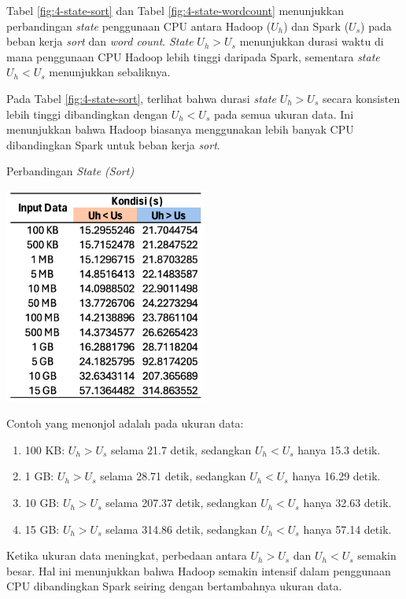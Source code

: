 Tabel \ref{fig:4-state-sort} dan Tabel \ref{fig:4-state-wordcount} menunjukkan perbandingan \textit{state} penggunaan CPU antara Hadoop ($U_h$) dan Spark ($U_s$) pada beban kerja \textit{sort} dan \textit{word count}. \textit{State} $U_h > U_s$ menunjukkan durasi waktu di mana penggunaan CPU Hadoop lebih tinggi daripada Spark, sementara \textit{state} $U_h < U_s$ menunjukkan sebaliknya.

Pada Tabel \ref{fig:4-state-sort}, terlihat bahwa durasi \textit{state} $U_h > U_s$ secara konsisten lebih tinggi dibandingkan dengan $U_h < U_s$ pada semua ukuran data. Ini menunjukkan bahwa Hadoop biasanya menggunakan lebih banyak CPU dibandingkan Spark untuk beban kerja \textit{sort}.

\begin{table}[h]
  \centering
  \caption{Perbandingan \textit{State (Sort)}}
  \includegraphics[width=0.5\textwidth]{figures/ch04/4-kondisi-sort}
  \label{fig:4-state-sort}
\end{table}

Contoh yang menonjol adalah pada ukuran data:
\begin{enumerate}
	\item 100 KB: $U_h > U_s$ selama 21.7 detik, sedangkan $U_h < U_s$ hanya 15.3 detik.
	\item 1 GB: $U_h > U_s$ selama 28.71 detik, sedangkan $U_h < U_s$ hanya 16.29 detik.
	\item 10 GB: $U_h > U_s$ selama 207.37 detik, sedangkan $U_h < U_s$ hanya 32.63 detik.
	\item 15 GB: $U_h > U_s$ selama 314.86 detik, sedangkan $U_h < U_s$ hanya 57.14 detik.
\end{enumerate}

Ketika ukuran data meningkat, perbedaan antara $U_h > U_s$ dan $U_h < U_s$ semakin besar. Hal ini menunjukkan bahwa Hadoop semakin intensif dalam penggunaan CPU dibandingkan Spark seiring dengan bertambahnya ukuran data.

